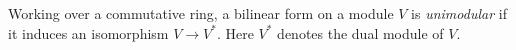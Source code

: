 \documentclass[12pt]{article}
\begin{document}
Working over a commutative ring, a bilinear form on a module $V$ is \emph{unimodular} if it induces an isomorphism $V \to V^*$.  Here $V^*$ denotes the dual module of $V$.
\end{document}
